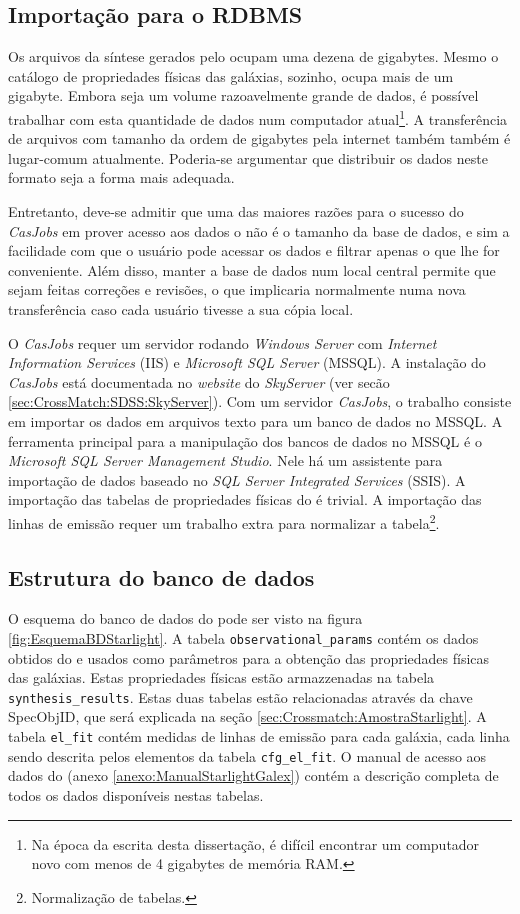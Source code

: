 \subsection{Importação para o RDBMS}

Os arquivos da síntese gerados pelo \starlight ocupam uma dezena de gigabytes.
Mesmo o catálogo de propriedades físicas das galáxias, sozinho, ocupa mais de um
gigabyte. Embora seja um volume razoavelmente grande de dados, é possível
trabalhar com esta quantidade de dados num computador atual\footnote{Na época da
escrita desta dissertação, é difícil encontrar um computador novo com menos de 4
gigabytes de memória RAM.}. A transferência de arquivos com tamanho da ordem de
gigabytes pela internet também também é lugar-comum atualmente. Poderia-se
argumentar que distribuir os dados neste formato seja a forma mais adequada.

Entretanto, deve-se admitir que uma das maiores razões para o sucesso do {\em
CasJobs} em prover acesso aos dados o \SDSS não é o tamanho da base de dados, e
sim a facilidade com que o usuário pode acessar os dados e filtrar apenas o que
lhe for conveniente. Além disso, manter a base de dados num local central
permite que sejam feitas correções e revisões, o que implicaria normalmente numa
nova transferência caso cada usuário tivesse a sua cópia local.

O {\em CasJobs} requer um servidor rodando {\em Windows Server} com {\em
Internet Information Services} (IIS) e {\em Microsoft SQL Server} (MSSQL). A
instalação do {\em CasJobs} está documentada no {\em website} do {\em SkyServer}
(ver secão \ref{sec:CrossMatch:SDSS:SkyServer}). Com um servidor {\em CasJobs},
o trabalho consiste em importar os dados em arquivos texto para um banco de
dados no MSSQL. A ferramenta principal para a manipulação dos bancos de dados no
MSSQL é o {\em Microsoft SQL Server Management Studio}. Nele há um assistente
para importação de dados baseado no {\em SQL Server Integrated Services} (SSIS).
A importação das tabelas de propriedades físicas do \starlight é trivial. A
importação das linhas de emissão requer um trabalho extra para normalizar a
tabela\footnote{Normalização de tabelas.\fixme}.

\subsection{Estrutura do banco de dados}

O esquema do banco de dados do \starlight pode ser visto na figura
\ref{fig:EsquemaBDStarlight}. A tabela {\tt observational\_params} contém os
dados obtidos do \SDSS e usados como parâmetros para a obtenção das propriedades
físicas das galáxias. Estas propriedades físicas estão armazzenadas na tabela
{\tt synthesis\_results}. Estas duas tabelas estão relacionadas através da chave
{SpecObjID}, que será explicada na seção \ref{sec:Crossmatch:AmostraStarlight}.
A tabela {\tt el\_fit} contém medidas de linhas de emissão para cada galáxia,
cada linha sendo descrita pelos elementos da tabela {\tt cfg\_el\_fit}. O manual
de acesso aos dados do \starlight (anexo \ref{anexo:ManualStarlightGalex})
contém a descrição completa de todos os dados disponíveis nestas tabelas.


